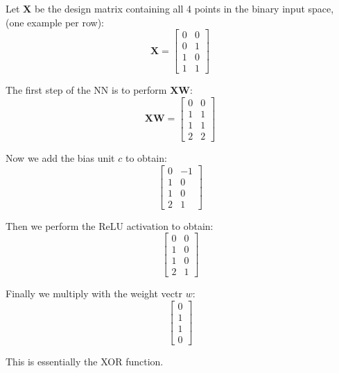 \documentclass[fleqn]{article}
\begin{document}
\begin{enumerate}[a)]
    Let $\bm{X}$ be the design matrix containing all 4 points in the binary input space, (one example per row):
    $$\bm{X} = \begin{bmatrix}
    0 & 0 \\
    0 & 1 \\
    1 & 0 \\
    1 & 1
    \end{bmatrix}$$
    
    The first step of the NN is to perform $\bm{XW}$:
    $$\bm{XW} = \begin{bmatrix}
    0 & 0 \\
    1 & 1 \\
    1 & 1 \\
    2 & 2
    \end{bmatrix}$$
    
    Now we add the bias unit $c$ to obtain:
    $$\begin{bmatrix}
    0 & -1 \\
    1 & 0 \\
    1 & 0 \\
    2 & 1
    \end{bmatrix}$$
    
    Then we perform the ReLU activation to obtain:
    $$\begin{bmatrix}
    0 & 0 \\
    1 & 0 \\
    1 & 0 \\
    2 & 1
    \end{bmatrix}$$
    
    Finally we multiply with the weight vectr $w$:
    $$\begin{bmatrix}
    0 \\
    1 \\
    1 \\
    0
    \end{bmatrix}$$
    
    This is essentially the XOR function.
\end{enumerate}
\end{document}
